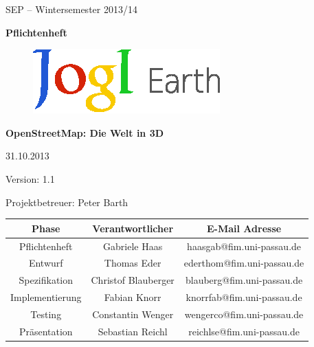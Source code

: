 \documentclass[10pt]{scrreprt}
\begin{document}
\begin{center}
\vspace{2.0 cm}
{\LARGE SEP – Wintersemester 2013/14}

\vspace{1.0 cm}
\textbf{{\Huge Pflichtenheft}}

\vspace{0.8 cm}
\begin{figure}[!htb]
\begin{center}
	\includegraphics[scale=1.5]{Logo-Print.eps}
\end{center}
\end{figure}

\vspace{0.2 cm}
\textbf{{\huge OpenStreetMap: Die Welt in 3D}}

\vspace{1.5 cm}
31.10.2013

\vspace{0.5 cm}
Version: 1.1

\vspace{1.5 cm}
{\Large Projektbetreuer: Peter Barth}

\vspace{1.5 cm}
\begin{tabular}{|c|c|c|}
\hline 
\rule[-1ex]{0pt}{4ex} \textbf{Phase} & \textbf{Verantwortlicher} & \textbf{E-Mail Adresse} \\ 
\hline  \hline
\rule[-1ex]{0pt}{4ex} Pflichtenheft & Gabriele Haas & haasgab@fim.uni-passau.de \\ 
\hline  \hline
\rule[-1ex]{0pt}{4ex} Entwurf & Thomas Eder & ederthom@fim.uni-passau.de \\ 
\hline  \hline
\rule[-1ex]{0pt}{4ex} Spezifikation & Christof Blauberger & blauberg@fim.uni-passau.de \\ 
\hline  \hline
\rule[-1ex]{0pt}{4ex} Implementierung & Fabian Knorr & knorrfab@fim.uni-passau.de \\ 
\hline \hline 
\rule[-1ex]{0pt}{4ex} Testing & Constantin Wenger & wengerco@fim.uni-passau.de \\ 
\hline  \hline
\rule[-1ex]{0pt}{4ex} Präsentation & Sebastian Reichl & reichlse@fim.uni-passau.de \\ 
\hline 
\end{tabular}

\end{center}
\end{document}
